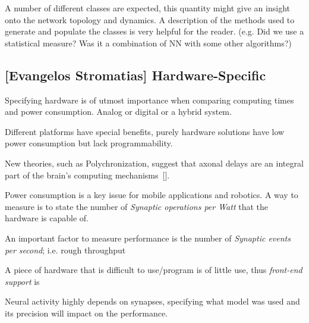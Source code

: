 A number of different classes are expected, this quantity might give an insight onto the network topology and dynamics. A description of the methods used to generate and populate the classes is very helpful for the reader. (e.g. Did we use a statistical measure? Was it a combination of NN with some other algorithms?)




\subsection{[Evangelos Stromatias] Hardware-Specific}
Specifying hardware is of utmost importance when comparing computing times and power consumption. Analog or digital or a hybrid system.

Different platforms have special benefits, purely hardware solutions have low power consumption but lack programmability.

New theories, such as Polychronization, suggest that axonal delays are an integral part of the brain's computing mechanisms~[\cite{Izhikevich2005}]. 

Power consumption is a key issue for mobile applications and robotics. A way to measure is to state the number of \emph{Synaptic operations per Watt} that the hardware is capable of.

An important factor to measure performance is the number of \emph{Synaptic events per second}; i.e. rough throughput

A piece of hardware that is difficult to use/program is of little use, thus \emph{front-end support} is

Neural activity highly depends on synapses, specifying what model was used and its precision will impact on the performance.

